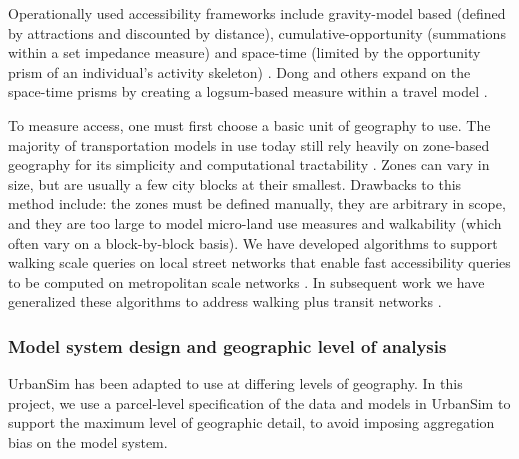 Operationally used accessibility frameworks include gravity-model based (defined by attractions and discounted by distance), cumulative-opportunity (summations within a set impedance measure) and space-time (limited by the opportunity prism of an individual's activity skeleton) \citep{kwan_space-time_1998,miller_measuring_1999}.  Dong and others expand on the space-time prisms by creating a logsum-based measure within a travel model \citep{dong_moving_2006}.  

To measure access, one must first choose a basic unit of geography to use.  The majority of transportation models in use today still rely heavily on zone-based geography for its simplicity and computational tractability \citep{hunt_current_2005}.  Zones can vary in size, but are usually a few city blocks at their smallest.  Drawbacks to this method include: the zones must be defined manually, they are arbitrary in scope, and they are too large to model micro-land use measures and walkability (which often vary on a block-by-block basis). We have developed algorithms to support walking scale queries on local street networks that enable fast accessibility queries to be computed on metropolitan scale networks \citep{foti2012generalized}.  In subsequent work we have generalized these algorithms to address walking plus transit networks \citep{blanchard2017urbanaccess, blanchard-waddell-trr-2017}. 


\subsubsection{Model system design and geographic level of analysis}

UrbanSim has been adapted to use at differing levels of geography. In this project, we use a parcel-level specification of the data and models in UrbanSim to support the maximum level of geographic detail, to avoid imposing aggregation bias on the model system. 


